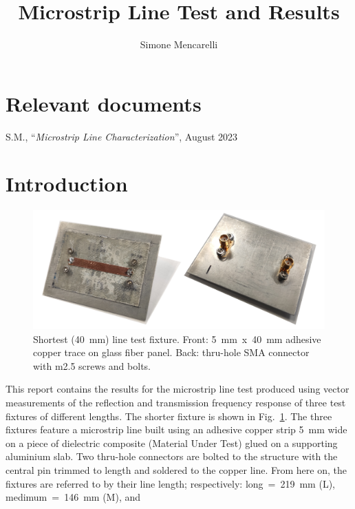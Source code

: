 \documentclass[11pt,a4paper]{article}
\title{Microstrip Line Test and Results}
\author{Simone Mencarelli}
\newcommand{\fig}[1]{Fig.~\ref{#1}}
\newcommand{\laser}[1]{``#1''}
\begin{document}
    \maketitle


    \section{Relevant documents}
    \label{sec:relevant-documents}
    \begin{enumerate}[start=1,label={[Doc\arabic*]}]
        \item S.M., \laser{\emph{Microstrip Line Characterization}}, August 2023 \label{doc:microstrip-characterization}
    \end{enumerate}


    \section{Introduction}
    \label{sec:introduction}
    \begin{figure}[!h]
        \includegraphics[width=\textwidth]{fixture}
        \caption{Shortest (40~mm) line test fixture. Front: 5~mm~x~40~mm adhesive copper trace on glass fiber panel.
        Back: thru-hole SMA connector with m2.5 screws and bolts.}
        \label{fig:photo}
    \end{figure}
    This report contains the results for the microstrip line test produced using vector measurements of the reflection
    and transmission frequency response of three test fixtures of different lengths.
    The shorter fixture is shown in \fig{fig:photo}.
    The three fixtures feature a microstrip line built using an adhesive copper strip 5~mm wide on a piece of dielectric
    composite (Material Under Test) glued on a supporting aluminium slab.
    Two thru-hole connectors are bolted to the structure with the central pin trimmed to length and soldered to the copper line.
    From here on, the fixtures are referred to by their line length; respectively: long~=~219~mm (L), medimum~=~146~mm (M), and
\end{document}
